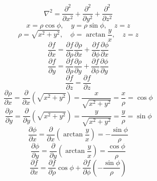 
\begin{equation}
    \nabla^{2} = \frac{\partial^{2}{}}{\partial{x}^{2}} + \frac{\partial^{2}{}}{\partial{y}^{2}} + \frac{\partial^{2}{}}{\partial{z}^{2}}
\end{equation}
\begin{equation}
    x = \rho \cos{\phi}, \quad y = \rho \sin{\phi}, \quad z = z
\end{equation}
\begin{equation}
    \rho = \sqrt{x^{2} + y^{2}}, \quad \phi = \arctan{\frac{y}{x}}, \quad z = z
\end{equation}
\begin{equation}
    \frac{\partial{f}}{\partial{x}} = \frac{\partial{f}}{\partial{\rho}} \frac{\partial{\rho}}{\partial{x}} + \frac{\partial{f}}{\partial{\phi}} \frac{\partial{\phi}}{\partial{x}}
\end{equation}
\begin{equation}
    \frac{\partial{f}}{\partial{y}} = \frac{\partial{f}}{\partial{\rho}} \frac{\partial{\rho}}{\partial{y}} + \frac{\partial{f}}{\partial{\phi}} \frac{\partial{\phi}}{\partial{y}}
\end{equation}
\begin{equation}
    \frac{\partial{f}}{\partial{z}} = \frac{\partial{f}}{\partial{z}}
\end{equation}
\begin{equation}
    \frac{\partial{\rho}}{\partial{x}} = \frac{\partial}{\partial{x}} \left( \sqrt{x^{2} + y^{2}} \right) = \frac{x}{\sqrt{x^{2} + y^{2}}} = \frac{x}{\rho} = \cos{\phi}
\end{equation}
\begin{equation}
    \frac{\partial{\rho}}{\partial{y}} = \frac{\partial}{\partial{y}} \left( \sqrt{x^{2} + y^{2}} \right) = \frac{y}{\sqrt{x^{2} + y^{2}}} = \frac{y}{\rho} = \sin{\phi}
\end{equation}
\begin{equation}
    \frac{\partial{\phi}}{\partial{x}} = \frac{\partial}{\partial{x}} \left( \arctan{\frac{y}{x}} \right) = - \frac{\sin{\phi}}{\rho}
\end{equation}
\begin{equation}
    \frac{\partial{\phi}}{\partial{y}} = \frac{\partial}{\partial{y}} \left( \arctan{\frac{y}{x}} \right) = \frac{\cos{\phi}}{\rho}
\end{equation}
\begin{equation}
    \frac{\partial{f}}{\partial{x}} = \frac{\partial{f}}{\partial{\rho}} \cos{\phi} + \frac{\partial{f}}{\partial{\phi}} \left( - \frac{\sin{\phi}}{\rho} \right)
\end{equation}

